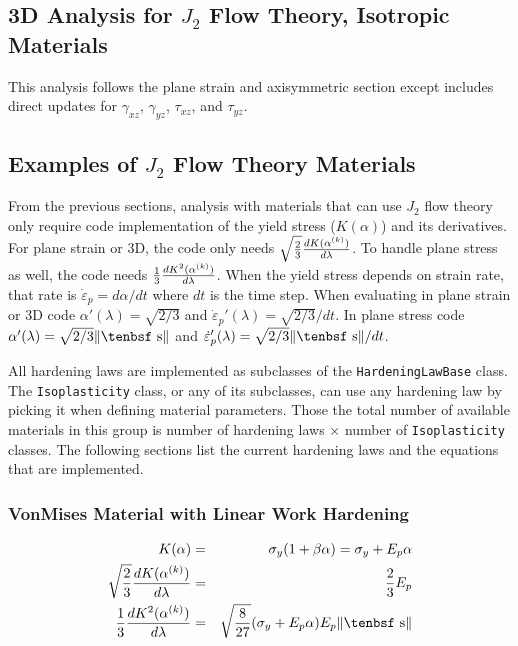 \documentclass[11pt]{article}
\def\dev{\hbox{\tenbsf s}}
\begin{document}
\subsection{3D Analysis for $J_2$ Flow Theory, Isotropic Materials}

This analysis follows the plane strain and axisymmetric section except includes direct updates for $\gamma_{xz}$, $\gamma_{yz}$, $\tau_{xz}$, and $\tau_{yz}$.


\subsection{Examples of $J_2$ Flow Theory Materials}

From the previous sections, analysis with materials that can use $J_2$ flow theory only require code implementation of the yield stress ($K(\alpha)$) and its derivatives. For plane strain or 3D, the code only needs $\sqrt{2\over3}{dK(\alpha^{(k)})\over d\lambda}$. To handle plane stress as well, the code needs ${1\over3}{dK^2(\alpha^{(k)})\over d\lambda}$. When the yield stress depends on strain rate, that rate is $\dot{\varepsilon}_p = d\alpha/dt$ where $dt$ is the time step. When evaluating in plane strain or 3D code $\alpha'(\lambda) = \sqrt{2/3}$ and $\dot{\varepsilon}_p'(\lambda) = \sqrt{2/3}/dt$. In plane stress code $\alpha'(\lambda) = \sqrt{2/3}\|\dev\|$ and $\dot{\varepsilon}_p'(\lambda) = \sqrt{2/3}\|\dev\|/dt$.

All hardening laws are implemented as subclasses of the {\tt HardeningLawBase} class. The {\tt Isoplast\-icity} class, or any of its subclasses, can use any hardening law by picking it when defining material parameters. Those the total  number of available materials in this group is number of hardening laws $\times$ number of  {\tt Isoplasticity} classes. The following sections list the current hardening laws and the equations that are implemented.

\subsubsection{VonMises Material with Linear Work Hardening}

\begin{eqnarray}
   K(\alpha) & = & \sigma_y(1+\beta\alpha) =  \sigma_y + E_p\alpha \\
   \sqrt{2\over3}{dK(\alpha^{(k)})\over d\lambda} & = & {2\over 3}E_p \\
   {1\over3}{dK^2(\alpha^{(k)})\over d\lambda} & = & \sqrt{8\over27} (\sigma_y + E_p\alpha)E_p \|\dev\|
\end{eqnarray}
\end{document}
